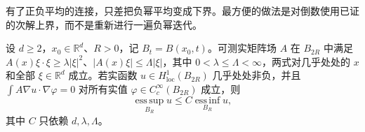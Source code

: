 有了正负平均的连接，只差把负幂平均变成下界。最方便的做法是对倒数使用已证的次解上界，而不是重新进行一遍负幂迭代。

\begin{theorem}
\label{b2:thm:H2-linear-harnack}
设 \(d\geq2\)，\(x_0\in\mathbb R^d\)、\(R>0\)，记 \(B_t=B(x_0,t)\)。可测实矩阵场 \(A\) 在 \(B_{2R}\) 中满足
\(A(x)\xi\cdot\xi\geq\lambda|\xi|^2\)、\(|A(x)\xi|\leq\Lambda|\xi|\)，其中 \(0<\lambda\leq\Lambda<\infty\)，两式对几乎处处的 \(x\) 和全部 \(\xi\in\mathbb R^d\) 成立。若实函数 \(u\in H^1_{\mathrm{loc}}(B_{2R})\) 几乎处处非负，并且
\(\int A\nabla u\cdot\nabla\varphi=0\) 对所有实值 \(\varphi\in C_c^\infty(B_{2R})\) 成立，则
\[
 \operatorname*{ess\,sup}_{B_R}u
 \leq C\operatorname*{ess\,inf}_{B_R}u,
\]
其中 \(C\) 只依赖 \(d,\lambda,\Lambda\)。
\end{theorem}

